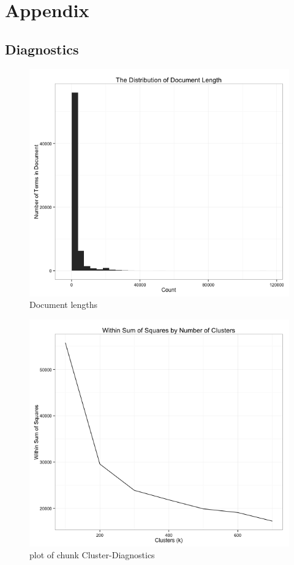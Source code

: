 \documentclass[11pt,article,oneside]{memoir}
\makeatletter
\def\maxwidth{\ifdim\Gin@nat@width>\linewidth\linewidth
\else\Gin@nat@width\fi}
\let\Oldincludegraphics\includegraphics
\renewcommand{\includegraphics}[1]{\Oldincludegraphics[width=\maxwidth]{#1}}
\makeatother
\begin{document}
\pagebreak

\section{Appendix}\label{appendix}

\subsection{Diagnostics}\label{diagnostics}

\begin{figure}[htbp]
\centering
\includegraphics{figure/Document-Lengths.png}
\caption{Document lengths}
\end{figure}

\begin{figure}[htbp]
\centering
\includegraphics{figure/Cluster-Diagnostics.png}
\caption{plot of chunk Cluster-Diagnostics}
\end{figure}
\end{document}
